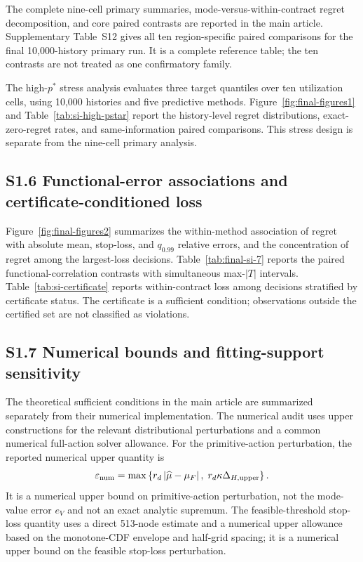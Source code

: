 \documentclass[AMA,Times1COL]{WileyNJDv5}
\begin{document}
The complete nine-cell primary summaries, mode-versus-within-contract
regret decomposition, and core paired contrasts are reported in the main
article. Supplementary Table~S12 gives all ten region-specific paired
comparisons for the final 10,000-history primary run. It is a complete
reference table; the ten contrasts are not treated as one confirmatory
family.

The high-$p^*$ stress analysis evaluates three target quantiles over ten
utilization cells, using 10,000 histories and five predictive methods.
Figure~\ref{fig:final-figures1} and Table~\ref{tab:si-high-pstar}
report the history-level regret distributions, exact-zero-regret rates,
and same-information paired comparisons. This stress design is separate
from the nine-cell primary analysis.


\subsection*{S1.6 Functional-error associations and certificate-conditioned loss}

Figure~\ref{fig:final-figures2} summarizes the within-method association
of regret with absolute mean, stop-loss, and $q_{0.99}$ relative errors,
and the concentration of regret among the largest-loss decisions.
Table~\ref{tab:final-si-7} reports the paired functional-correlation
contrasts with simultaneous max-$|T|$ intervals. Table~\ref{tab:si-certificate}
reports within-contract loss among decisions stratified by certificate
status. The certificate is a sufficient condition; observations outside
the certified set are not classified as violations.


\subsection*{S1.7 Numerical bounds and fitting-support sensitivity}

The theoretical sufficient conditions in the main article are
summarized separately from their numerical implementation. The
numerical audit uses upper constructions for the relevant distributional
perturbations and a common numerical full-action solver allowance.
For the primitive-action perturbation, the reported numerical upper
quantity is
\[
\varepsilon_{\rm num}
=\max\left\{
r_d\left|\widehat\mu-\mu_F\right|,
\;r_d\kappa\Delta_{H,\rm upper}
\right\}.
\]
It is a numerical upper bound on primitive-action perturbation, not the
mode-value error $e_V$ and not an exact analytic supremum. The
feasible-threshold stop-loss quantity uses a direct 513-node estimate
and a numerical upper allowance based on the monotone-CDF envelope and
half-grid spacing; it is a numerical upper bound on the feasible
stop-loss perturbation.
\end{document}
